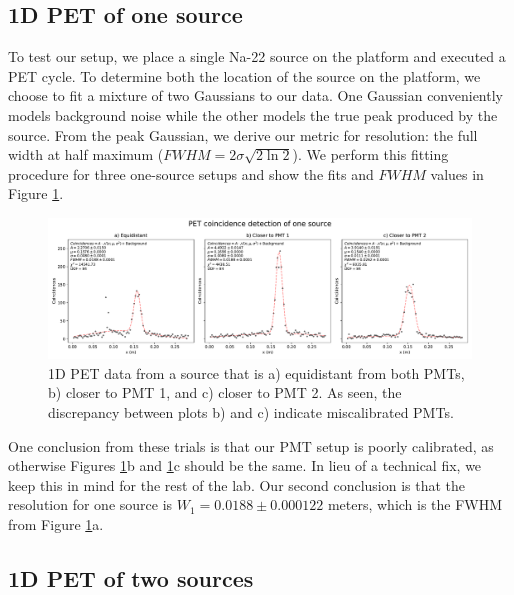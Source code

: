 \documentclass[12pt, letterpaper]{article}
\begin{document}
\subsection{1D PET of one source}\label{sec:resolution}

To test our setup, we place a single Na-22 source on the platform and executed a PET cycle. To determine both the location of the source on the platform, we choose to fit a mixture of two Gaussians to our data. One Gaussian conveniently models background noise while the other models the true peak produced by the source. From the peak Gaussian, we derive our metric for resolution: the full width at half maximum ($FWHM = 2 \sigma \sqrt{2 \ln 2}$). We perform this fitting procedure for three one-source setups and show the fits and $FWHM$ values in Figure \ref{fig:one_source}. 
\begin{figure}
    \centering
    \includegraphics[width=1\linewidth]{experiment5/figures/one_source.pdf}
    \caption{1D PET data from a source that is a) equidistant from both PMTs, b) closer to PMT 1, and c) closer to PMT 2. As seen, the discrepancy between plots b) and c) indicate miscalibrated PMTs. }
    \label{fig:one_source}
\end{figure}

One conclusion from these trials is that our PMT setup is poorly calibrated, as otherwise Figures \ref{fig:one_source}b and \ref{fig:one_source}c should be the same. In lieu of a technical fix, we keep this in mind for the rest of the lab. Our second conclusion is that the resolution for one source is $W_1 = 0.0188 \pm 0.000122$ meters, which is the FWHM from Figure \ref{fig:one_source}a. 

\subsection{1D PET of two sources}
\end{document}
